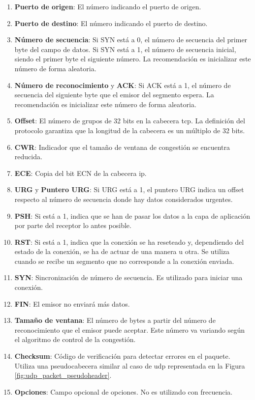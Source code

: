 \begin{enumerate}
    \item \textbf{Puerto de origen}: El número indicando el puerto de origen.
    \item \textbf{Puerto de destino}:  El número indicando el puerto de destino.
    \item \textbf{Número de secuencia}: Si SYN está a 0, el número de secuencia del primer byte del campo de datos. Si SYN está a 1, el número de secuencia inicial, siendo el primer byte el siguiente número. La recomendación es inicializar este número de forma aleatoria.
    \item \textbf{Número de reconocimiento} y \textbf{ACK}: Si ACK está a 1, el número de secuencia del siguiente byte que el emisor del segmento espera.  La recomendación es inicializar este número de forma aleatoria.
    \item \textbf{Offset}: El número de grupos de 32 bits en la cabecera \acrshort{tcp}. La definición del protocolo garantiza que la longitud de la cabecera es un múltiplo de 32 bits.
    \item \textbf{CWR}: Indicador que el tamaño de ventana de congestión se encuentra reducida.
    \item \textbf{ECE}: Copia del bit ECN de la cabecera \acrshort{ip}.
    \item \textbf{URG} y \textbf{Puntero URG}: Si URG está a 1, el puntero URG indica un offset respecto al número de secuencia donde hay datos considerados urgentes.
    \item \textbf{PSH}: Si está a 1, indica que se han de pasar los datos a la capa de aplicación por parte del receptor lo antes posible.
    \item \textbf{RST}: Si está a 1, indica que la conexión se ha reseteado y, dependiendo del estado de la conexión, se ha de actuar de una manera u otra. Se utiliza cuando se recibe un segmento que no corresponde a la conexión enviada.
    \item \textbf{SYN}: Sincronización de número de secuencia. Es utilizado para iniciar una conexión.
    \item \textbf{FIN}: El emisor no enviará más datos. 
    \item \textbf{Tamaño de ventana}: El número de bytes a partir del número de reconocimiento que el emisor puede aceptar. Este número va variando según el algoritmo de control de la congestión.
    \item \textbf{Checksum}: Código de verificación para detectar errores en el paquete. Utiliza una pseudocabecera similar al caso de \acrshort{udp} representada en la Figura \ref{fig:udp_packet_pseudoheader}.
    \item \textbf{Opciones}: Campo opcional de opciones. No es utilizado con frecuencia.
\end{enumerate}
